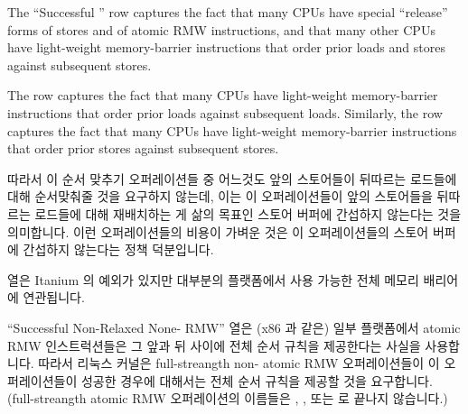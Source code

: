 {	The ``Successful '' row captures the fact that many
	CPUs have special ``release'' forms of stores and of atomic RMW
	instructions, and that many other CPUs have light-weight memory-barrier
	instructions that order prior loads and stores against
	subsequent stores.

	The  row captures the fact that many CPUs have
	light-weight memory-barrier instructions that order prior loads against
	subsequent loads.
	Similarly,
	the  row captures the fact that many CPUs have
	light-weight memory-barrier instructions that order prior stores against
	subsequent stores.
	\fi

	따라서 이 순서 맞추기 오퍼레이션들 중 어느것도 앞의 스토어들이 뒤따르는
	로드들에 대해 순서맞춰줄 것을 요구하지 않는데, 이는 이 오퍼레이션들이
	앞의 스토어들을 뒤따르는 로드들에 대해 재배치하는 게 삶의 목표인 스토어
	버퍼에 간섭하지 않는다는 것을 의미합니다.
	이런 오퍼레이션들의 비용이 가벼운 것은 이 오퍼레이션들의 스토어 버퍼에
	간섭하지 않는다는 정책 덕분입니다.

	 열은 Itanium 의 예외가 있지만 대부분의 플랫폼에서 사용
	가능한 전체 메모리 배리어에 연관됩니다.

	``Successful Non-Relaxed None- RMW'' 열은 (x86 과 같은) 일부
	플랫폼에서 atomic RMW 인스트럭션들은 그 앞과 뒤 사이에 전체 순서 규칙을
	제공한다는 사실을 사용합니다.
	따라서 리눅스 커널은 full-streangth non- atomic RMW 오퍼레이션들이 이
	오퍼레이션들이 성공한 경우에 대해서는 전체 순서 규칙을 제공할 것을
	요구합니다.
	(full-streangth atomic RMW 오퍼레이션의 이름들은 ,
	, 또는  로 끝나지 않습니다.)

}
